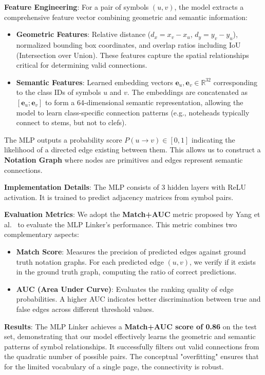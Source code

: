 \documentclass[twocolumn, a4paper, 10pt]{article}
\begin{document}
\textbf{Feature Engineering}: For a pair of symbols $(u, v)$, the model extracts a comprehensive feature vector combining geometric and semantic information:
\begin{itemize}
    \item \textbf{Geometric Features}: Relative distance ($d_x = x_v - x_u$, $d_y = y_v - y_u$), normalized bounding box coordinates, and overlap ratios including IoU (Intersection over Union). These features capture the spatial relationships critical for determining valid connections.
    \item \textbf{Semantic Features}: Learned embedding vectors $\mathbf{e}_u, \mathbf{e}_v \in \mathbb{R}^{32}$ corresponding to the class IDs of symbols $u$ and $v$. The embeddings are concatenated as $[\mathbf{e}_u; \mathbf{e}_v]$ to form a 64-dimensional semantic representation, allowing the model to learn class-specific connection patterns (e.g., noteheads typically connect to stems, but not to clefs).
\end{itemize}

The MLP outputs a probability score $P(u \to v) \in [0, 1]$ indicating the likelihood of a directed edge existing between them. This allows us to construct a \textbf{Notation Graph} where nodes are primitives and edges represent semantic connections.

\textbf{Implementation Details}: The MLP consists of 3 hidden layers with ReLU activation. It is trained to predict adjacency matrices from symbol pairs.

\textbf{Evaluation Metrics}: We adopt the \textbf{Match+AUC} metric proposed by Yang et al.~\cite{yang2024completeomrsolution} to evaluate the MLP Linker's performance. This metric combines two complementary aspects:
\begin{itemize}
    \item \textbf{Match Score}: Measures the precision of predicted edges against ground truth notation graphs. For each predicted edge $(u, v)$, we verify if it exists in the ground truth graph, computing the ratio of correct predictions.
    \item \textbf{AUC (Area Under Curve)}: Evaluates the ranking quality of edge probabilities. A higher AUC indicates better discrimination between true and false edges across different threshold values.
\end{itemize}

\textbf{Results}: The MLP Linker achieves a \textbf{Match+AUC score of 0.86} on the test set, demonstrating that our model effectively learns the geometric and semantic patterns of symbol relationships. It successfully filters out valid connections from the quadratic number of possible pairs. The conceptual "overfitting" ensures that for the limited vocabulary of a single page, the connectivity is robust.
\end{document}
